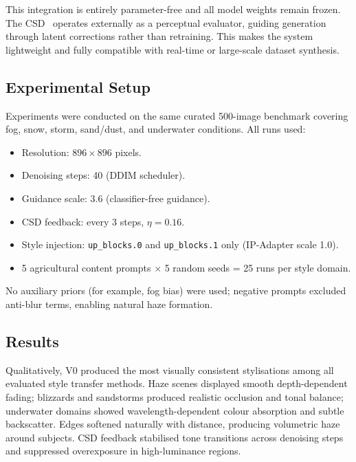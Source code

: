 \noindent This integration is entirely parameter-free and all model weights remain frozen.
The CSD~\cite{somepalli2024csd} operates externally as a perceptual evaluator, guiding generation through latent corrections rather than retraining.
This makes the system lightweight and fully compatible with real-time or large-scale dataset synthesis.

\subsection{Experimental Setup}
\label{sec:prop_exp}

\noindent Experiments were conducted on the same curated 500-image benchmark covering fog, snow, storm, sand/dust, and underwater conditions.
All runs used:
\begin{itemize}
    \item Resolution: $896\times896$ pixels.
    \item Denoising steps: 40 (DDIM scheduler).
    \item Guidance scale: 3.6 (classifier-free guidance).
    \item CSD feedback: every 3 steps, $\eta=0.16$.
    \item Style injection: \texttt{up\_blocks.0} and \texttt{up\_blocks.1} only (IP-Adapter scale 1.0).
    \item 5 agricultural content prompts $\times$ 5 random seeds = 25 runs per style domain.
\end{itemize}
No auxiliary priors (for example, fog bias) were used; negative prompts excluded anti-blur terms, enabling natural haze formation.

\subsection{Results}
\label{sec:prop_results}

\noindent Qualitatively, V0 produced the most visually consistent stylisations among all evaluated style transfer methods.
Haze scenes displayed smooth depth-dependent fading; blizzards and sandstorms produced realistic occlusion and tonal balance; underwater domains showed wavelength-dependent colour absorption and subtle backscatter.
Edges softened naturally with distance, producing volumetric haze around subjects.
CSD feedback stabilised tone transitions across denoising steps and suppressed overexposure in high-luminance regions.

